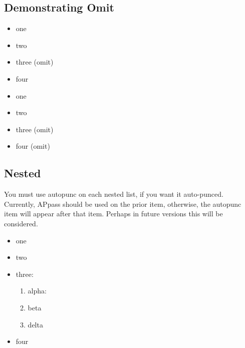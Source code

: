 \documentclass[11pt,parskip=half]{scrartcl}
\begin{document}
\subsection{Demonstrating Omit}

\begin{LTXexample}
\begin{itemize}[autopunc]
    \item one
    \item two
    \item three (omit) \APomit
    \item four
\end{itemize}
\end{LTXexample}

\begin{LTXexample}
\begin{itemize}[autopunc]
    \item one
    \item two
    \item three (omit) \APomit
    \item four  (omit) \APomit
\end{itemize}
\end{LTXexample}

\subsection{Nested}
You must use autopunc on each nested list, if you want it auto-punced.
Currently, APpass should be used on the prior item, otherwise, the
autopunc item will appear after that item. Perhaps in future versions this will be considered.

\begin{LTXexample}
\begin{itemize}[autopunc]
    \item one
    \item two
    \item three:
    \begin{enumerate}[autopunc]
        \item alpha:
        \item beta
        \item delta
    \end{enumerate}
    \item four
\end{itemize}
\end{LTXexample}
\end{document}
